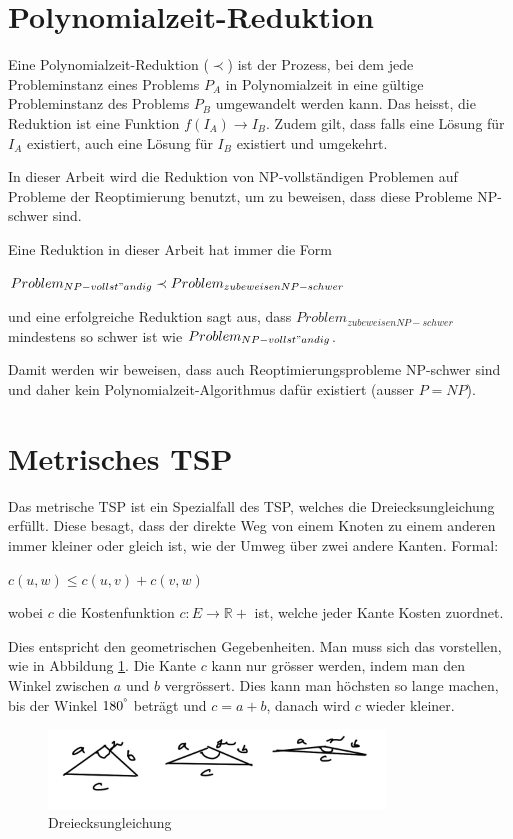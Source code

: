 \documentclass[a4paper,11pt]{scrreprt}
\begin{document}
\section{Polynomialzeit-Reduktion}

Eine Polynomialzeit-Reduktion ($\prec$) ist der Prozess, bei dem jede Probleminstanz eines Problems $P_A$ in Polynomialzeit in eine gültige Probleminstanz des Problems $P_B$ umgewandelt werden kann. Das heisst, die 
Reduktion ist eine Funktion $f(I_A) \rightarrow I_B$. Zudem gilt, dass falls
eine Lösung für $I_A$ existiert, auch eine Lösung für $I_B$ existiert und umgekehrt.

In dieser Arbeit wird die Reduktion von NP-vollständigen Problemen auf Probleme
der Reoptimierung benutzt, um zu beweisen, dass diese Probleme NP-schwer sind.

Eine Reduktion in dieser Arbeit hat immer die Form 

$Problem_{NP-vollst"andig} \prec Problem_{zu beweisen NP-schwer}$ 

und eine erfolgreiche Reduktion sagt aus, dass $Problem_{zu  beweisen NP-schwer}$ mindestens so schwer ist wie $Problem_{NP-vollst"andig}$.

Damit werden wir beweisen, dass auch Reoptimierungsprobleme NP-schwer sind und daher kein Polynomialzeit-Algorithmus dafür existiert (ausser $P = NP$).

\section{Metrisches TSP}

Das metrische TSP ist ein Spezialfall des TSP, welches die Dreiecksungleichung erfüllt. Diese besagt, dass der direkte Weg von einem Knoten zu einem anderen immer kleiner oder gleich ist, wie der Umweg über zwei andere Kanten. Formal:

$c({u, w}) \le c({u, v}) + c({v, w})$

wobei $c$ die Kostenfunktion $c: E \rightarrow \mathbb{R}+$ ist, welche jeder Kante Kosten zuordnet.

Dies entspricht den geometrischen Gegebenheiten. Man muss sich das vorstellen,
wie in Abbildung \ref{fig:trangle-inequality}. Die Kante $c$ kann nur grösser 
werden, indem man den Winkel zwischen $a$ und $b$ vergrössert. Dies kann man 
höchsten so lange machen, bis der Winkel $180^\degree$ beträgt und $c = a + b$, danach
wird $c$ wieder kleiner.

\begin{figure}
\includegraphics[width=0.8\textwidth]{triangle_inequ.png}
\caption{Dreiecksungleichung}
\label{fig:trangle-inequality}
\end{figure}
\end{document}
